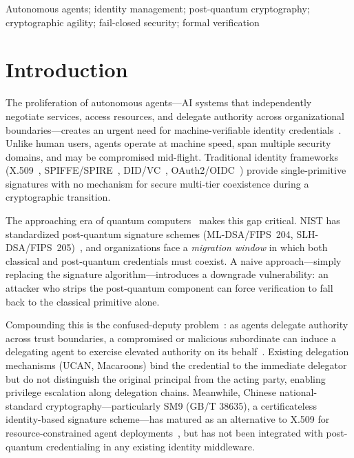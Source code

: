 \documentclass[10pt,twocolumn]{IEEEtran}
\begin{document}
\begin{IEEEkeywords}
Autonomous agents; identity management; post-quantum cryptography;
cryptographic agility; fail-closed security; formal verification
\end{IEEEkeywords}

\section{Introduction}

The proliferation of autonomous agents---AI systems that independently
negotiate services, access resources, and delegate authority across
organizational boundaries---creates an urgent need for machine-verifiable
identity credentials~\cite{ref:agent-id-1,ref:agent-id-2}. Unlike human
users, agents operate at machine speed, span multiple security domains,
and may be compromised mid-flight. Traditional identity frameworks
(X.509~\cite{ref:x509}, SPIFFE/SPIRE~\cite{ref:spiffe}, DID/VC~\cite{ref:did-vc},
OAuth2/OIDC~\cite{ref:oauth2}) provide single-primitive signatures with no
mechanism for secure multi-tier coexistence during a cryptographic
transition.

The approaching era of quantum computers~\cite{ref:quantum-threat} makes
this gap critical. NIST has standardized post-quantum signature schemes
(ML-DSA/FIPS~204, SLH-DSA/FIPS~205)~\cite{ref:fips204,ref:fips205}, and
organizations face a \emph{migration window} in which both classical and
post-quantum credentials must coexist. A naive approach---simply replacing
the signature algorithm---introduces a downgrade vulnerability: an attacker
who strips the post-quantum component can force verification to fall back
to the classical primitive alone.

Compounding this is the confused-deputy problem~\cite{ref:hardy1988}: as
agents delegate authority across trust boundaries, a compromised or
malicious subordinate can induce a delegating agent to exercise elevated
authority on its behalf~\cite{ref:agentic-threat-model,ref:mitre-atlas}.
Existing delegation mechanisms (UCAN, Macaroons) bind the credential to
the immediate delegator but do not distinguish the original principal
from the acting party, enabling privilege escalation along delegation
chains. Meanwhile, Chinese national-standard cryptography---particularly
SM9 (GB/T 38635), a certificateless identity-based signature scheme---has
matured as an alternative to X.509 for resource-constrained agent
deployments~\cite{ref:sm9-survey,ref:sm9-iot}, but has not been integrated
with post-quantum credentialing in any existing identity middleware.
\end{document}
